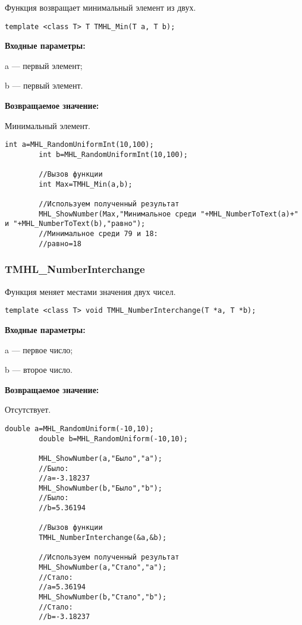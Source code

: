\documentclass[a4paper,12pt]{article}
\begin{document}
Функция возвращает минимальный элемент из двух.


\begin{lstlisting}[label=code_syntax_TMHL_Min,caption=Синтаксис]
template <class T> T TMHL_Min(T a, T b);
\end{lstlisting}

\textbf{Входные параметры:}

 a --- первый элемент;
	
 b --- первый элемент.

\textbf{Возвращаемое значение:}

Минимальный элемент.


\begin{lstlisting}[label=code_use_TMHL_Min,caption=Пример использования]
        int a=MHL_RandomUniformInt(10,100);
        int b=MHL_RandomUniformInt(10,100);

        //Вызов функции
        int Max=TMHL_Min(a,b);

        //Используем полученный результат
        MHL_ShowNumber(Max,"Минимальное среди "+MHL_NumberToText(a)+" и "+MHL_NumberToText(b),"равно");
        //Минимальное среди 79 и 18:
        //равно=18
\end{lstlisting}

\subsubsection{TMHL\_NumberInterchange}\label{TMHL_NumberInterchange}

Функция меняет местами значения двух чисел.


\begin{lstlisting}[label=code_syntax_TMHL_NumberInterchange,caption=Синтаксис]
template <class T> void TMHL_NumberInterchange(T *a, T *b);
\end{lstlisting}

\textbf{Входные параметры:}

 a --- первое число;
 
 b --- второе число.

\textbf{Возвращаемое значение:}

 Отсутствует.


\begin{lstlisting}[label=code_use_TMHL_NumberInterchange,caption=Пример использования]
        double a=MHL_RandomUniform(-10,10);
        double b=MHL_RandomUniform(-10,10);

        MHL_ShowNumber(a,"Было","a");
        //Было:
        //a=-3.18237
        MHL_ShowNumber(b,"Было","b");
        //Было:
        //b=5.36194

        //Вызов функции
        TMHL_NumberInterchange(&a,&b);

        //Используем полученный результат
        MHL_ShowNumber(a,"Стало","a");
        //Стало:
        //a=5.36194
        MHL_ShowNumber(b,"Стало","b");
        //Стало:
        //b=-3.18237
\end{lstlisting}
\end{document}
